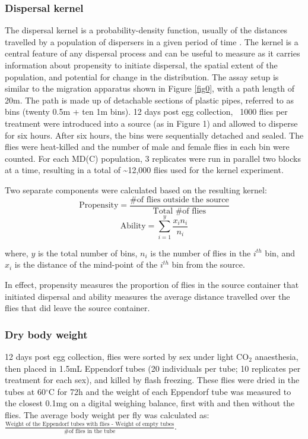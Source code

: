 \documentclass[12pt,onecolumn,twoside]{article}
\begin{document}
	\subsubsection{Dispersal kernel}
	The dispersal kernel is a probability-density function, usually of the distances travelled by a population of dispersers in a given period of time \citep{Clobert2012}. The kernel is a central feature of any dispersal process and can be useful to measure as it carries information about propensity to initiate dispersal, the spatial extent of the population, and potential for change in the distribution.
	The assay setup is similar to the migration apparatus shown in Figure \ref{fig0}, with a path length of 20m. The path is made up of detachable sections of plastic pipes, referred to as bins (twenty 0.5m + ten 1m bins). 12 days post egg collection, ~1000 flies per treatment were introduced into a source (as in Figure 1)  and allowed to disperse for six hours. After six hours, the bins were sequentially detached and sealed. The flies were heat-killed and the number of male and female flies in each bin were counted. For each MD(C) population, 3 replicates were run in parallel two blocks at a time, resulting in a total of \textasciitilde 12,000 flies used for the kernel experiment.

	Two separate components were calculated based on the resulting kernel:
	\[
		\text{Propensity} = \frac{\text{\# of flies outside the source}}{\text{Total \# of flies}}
	\]
	\[
		\text{Ability} = \sum_{i=1}^{y} \frac{x_{i}n_{i}}{n_{i}}
	\]

	where, $y$ is the total number of bins, $n_{i}$ is the number of flies in the $i^{th}$ bin, and $x_{i}$ is the distance of the mind-point of the $i^{th}$ bin from the source.

	In effect, propensity measures the proportion of flies in the source container that initiated dispersal and ability measures the average distance travelled over the flies that did leave the source container.

	\subsubsection{Dry body weight}
	12 days post egg collection, flies were sorted by sex under light CO$_\text{2}$ anaesthesia, then placed in 1.5mL Eppendorf tubes (20 individuals per tube; 10 replicates per treatment for each sex), and killed by flash freezing. These flies were dried in the tubes at 60$^{\circ}$C for 72h and the weight of each Eppendorf tube was measured to the closest 0.1mg on a digital weighing balance, first with and then without the flies. The average body weight per fly was calculated as: $\frac{\text{Weight of the Eppendorf tubes with flies - Weight of empty tubes}}{\text{\# of flies in the tube}}$.
\end{document}
